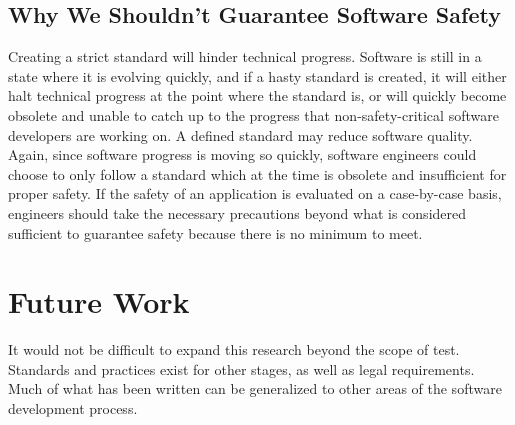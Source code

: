 \documentclass[12pt]{report}
\begin{document}
\subsection{Why We Shouldn't Guarantee Software Safety}  
Creating a strict standard will hinder technical progress. Software is still in a state where it is evolving quickly, and if a hasty standard is created, it will either halt technical progress at the point where the standard is, or will quickly become obsolete and unable to catch up to the progress that non-safety-critical software developers are working on.  
A defined standard may reduce software quality. Again, since software progress is moving so quickly, software engineers could choose to only follow a standard which at the time is obsolete and insufficient for proper safety. If the safety of an application is evaluated on a case-by-case basis, engineers should take the necessary precautions beyond what is considered sufficient to guarantee safety because there is no minimum to meet.  

\section{Future Work}  

It would not be difficult to expand this research beyond the scope of test. Standards and practices exist for other stages, as well as legal requirements. Much of what has been written can be generalized to other areas of the software development process.  

  
  
\end{document}
